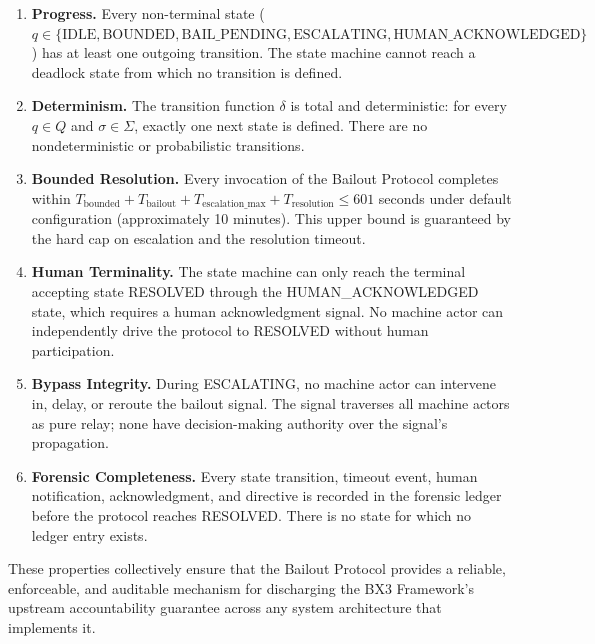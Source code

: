 \begin{enumerate}

\item \textbf{Progress.} Every non-terminal state ($q \in \{\text{IDLE}, \text{BOUNDED}, \text{BAIL\_PENDING}, \text{ESCALATING}, \text{HUMAN\_ACKNOWLEDGED}\}$) has at least one outgoing transition. The state machine cannot reach a deadlock state from which no transition is defined.

\item \textbf{Determinism.} The transition function $\delta$ is total and deterministic: for every $q \in Q$ and $\sigma \in \Sigma$, exactly one next state is defined. There are no nondeterministic or probabilistic transitions.

\item \textbf{Bounded Resolution.} Every invocation of the Bailout Protocol completes within $T_{\text{bounded}} + T_{\text{bailout}} + T_{\text{escalation\_max}} + T_{\text{resolution}} \leq 601$ seconds under default configuration (approximately 10 minutes). This upper bound is guaranteed by the hard cap on escalation and the resolution timeout.

\item \textbf{Human Terminality.} The state machine can only reach the terminal accepting state RESOLVED through the HUMAN\_ACKNOWLEDGED state, which requires a human acknowledgment signal. No machine actor can independently drive the protocol to RESOLVED without human participation.

\item \textbf{Bypass Integrity.} During ESCALATING, no machine actor can intervene in, delay, or reroute the bailout signal. The signal traverses all machine actors as pure relay; none have decision-making authority over the signal's propagation.

\item \textbf{Forensic Completeness.} Every state transition, timeout event, human notification, acknowledgment, and directive is recorded in the forensic ledger before the protocol reaches RESOLVED. There is no state for which no ledger entry exists.

\end{enumerate}

These properties collectively ensure that the Bailout Protocol provides a reliable, enforceable, and auditable mechanism for discharging the BX3 Framework's upstream accountability guarantee across any system architecture that implements it.